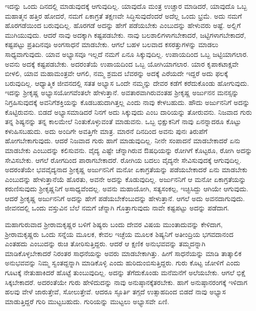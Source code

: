 ಇದನ್ನು ಒಂದು ದಿನದಲ್ಲಿ ಮಾಡುವುದಕ್ಕೆ ಆಗುವುದಿಲ್ಲ. ಯಾವುದೊ ಮಂತ್ರ ಉಚ್ಚಾರ ಮಾಡಿದರೆ, ಯಾವುದೊ ಒಬ್ಬ ಮಹಾತ್ಮನ ಹತ್ತಿರ ಹೋದರೆ, ನಮಗೆ ಏಕಾಗ್ರತೆ ತಕ್ಷಣವೇ ಸಿದ್ಧಿಸುವುದೆಂದರೆ ಅದೆಲ್ಲ ಒಂದು ಭ್ರಮೆ. ಅದು ನಮಗೆ ಹೊರಗಡೆಯಿಂದ ಬರುವುದಿಲ್ಲ. ಹೊರಗಡೆ ಅದನ್ನು ಹೇಗೆ ಪಡೆಯಬೇಕು ಎಂಬುದನ್ನು ಹೇಳುವರು ಅಷ್ಟೆ. ಅಲ್ಲಿಗೆ ಮುಗಿಯುವುದು. ಆದರೆ ನಾವು ಅದಕ್ಕಾಗಿ ಕಷ್ಟಪಡಬೇಕು. ನಾವು ಬಲಶಾಲಿಗಳಾಗಬೇಕಾದರೆ, ಜಟ್ಟಿಗಳಾಗ\-ಬೇಕಾದರೆ, ಕಷ್ಟಪಟ್ಟು ಪ್ರತಿದಿನವೂ ಅಂಗಸಾಧನೆ ಮಾಡಬೇಕು. ಆಗಲೆ ಬಹಳ ಬಲವಾದ ಕಸರತ್ತುಗಳನ್ನು ಮಾಡಲು ಸಾಧ್ಯವಾಗುವುದು. ಯಾವ ಅಭ್ಯಾಸವೂ ಇಲ್ಲದೆ ನಮಗೆ ಏನೂ ಸಿಕ್ಕುವುದಿಲ್ಲ. ಉಪಾಯದಿಂದ ಒಬ್ಬ ಜಟ್ಟಿಯಾಗಲಾರ. ಅವನು ಅದಕ್ಕೆ ಕಷ್ಟಪಡಬೇಕು. ಅದರಂತೆಯೆ ಉಪಾಯದಿಂದ ಒಬ್ಬ ಯೋಗಿಯಾಗಲಾರ. ಯಾರ ಕೃಪಾಕಟಾಕ್ಷವೇ ಬೀಳಲಿ, ಯಾವ ಮಹಾಮಂತ್ರವೇ ಆಗಲಿ, ನಮ್ಮ ಶ್ರಮದ ಬೆವರನ್ನು ಅದಕ್ಕೆ ಎರೆಯದೇ ಇದ್ದರೆ ಅದು ಫಲಕ್ಕೆ ಬರುವುದಿಲ್ಲ. ಆಧ್ಯಾತ್ಮಿಕ ಜೀವನದಲ್ಲಿ ಸತತ ಅಭ್ಯಾಸ ಒಂದೇ ನಮ್ಮನ್ನು ದೇವರ ಕಡೆಗೆ ಕರೆದುಕೊಂಡು ಹೋಗುವುದು. ಇದನ್ನು ಶ‍್ರೀಕೃಷ್ಣ ಅಭ್ಯಾಸಯೋಗವೆಂತಲೇ ಹೇಳುತ್ತಾನೆ. ಅವತಾರವಾಗಿರುವಂತಹ ಶ‍್ರೀಕೃಷ್ಣ ಅರ್ಜುನನ ಮನಸ್ಸನ್ನು ನಿಗ್ರಹಿಸುವುದಕ್ಕೆ ಅವನಿಗೆ\break ಶಕ್ತಿಯನ್ನು ಕೊಡಬಹುದಾಗಿತ್ತಲ್ಲ ಎಂದು ನಾವು ಕೇಳಬಹುದು. ಹೌದು ಅರ್ಜುನನಿಗೆ ಅದನ್ನು ಕೊಟ್ಟಿರುವನು. ಬಿಡದೆ ಅಭ್ಯಾಸಮಾಡಿದರೆ ನಿನಗೆ ಅದು ಸಿಕ್ಕುವುದು ಎಂಬ ದಾರಿಯನ್ನು ತೋರುವನು. ನಿಜವಾದ ಗುರು ತನ್ನ ಶಿಷ್ಯನನ್ನು ತನ್ನ ಕಾಲಮೇಲೆ ನಿಂತುಕೊಳ್ಳುವಂತೆ ಮಾಡು\-ವನು. ಒಬ್ಬ ಭಿಕ್ಷುಕನಿಗೆ ನಾವು ಏನನ್ನಾದರೂ ಕೊಟ್ಟು ಕಳುಹಿಸಬಹುದು. ಅದು ಅಂದಿಗೇ ಅವತ್ತಿಗೇ ಮಾತ್ರ. ಮಾರನೆ ದಿನದಿಂದ ಅವನು ಪುನಃ ತಿರುಪೆಗೆ ಹೋಗಬೇಕಾಗುವುದು. ಆದರೆ ನಿಜವಾದ ಗುರು ಹಾಗೆ ಮಾಡುವುದಿಲ್ಲ. ನೀನೇ ಸಂಪಾದನೆ ಮಾಡಬೇಕಾದರೆ ಏನು ಮಾಡಬೇಕು ಎಂಬುದನ್ನು ಕಲಿಸುವನು. ವೈದ್ಯ ಎಷ್ಟೇ ಚೆನ್ನಾಗಿರುವ ಔಷಧಿಯನ್ನು ರೋಗಿಗೆ ಕೊಟ್ಟರೂ, ರೋಗಿ ಅದನ್ನು ಸೇವಿಸಬೇಕು. ಆಗಲೆ ರೋಗದಿಂದ ಪಾರಾಗಬೇಕಾದರೆ. ರೋಗಿಯ ಬದಲು ವೈದ್ಯನೇ ಸೇವಿಸುವುದಕ್ಕೆ ಆಗುವುದಿಲ್ಲ. ಅದರಂತೆಯೇ ಭವವೈದ್ಯನಾದ ಶ‍್ರೀಕೃಷ್ಣ ಅರ್ಜುನನಿಗೆ ಮನೋ ಏಕಾಗ್ರತೆಯನ್ನು ಪಡೆಯಬೇಕಾದರೆ ಏನು ಮಾಡಬೇಕು ಎಂಬುದನ್ನು ಹೇಳುತ್ತಾನೆಯೆ ಹೊರತು, ಅವನೇ ಅದನ್ನು ಕೊಡುವುದಿಲ್ಲ. ಅರ್ಜುನನಿಗೆ ಆ ಮನೋ ಏಕಾಗ್ರತೆಯನ್ನು ಕರುಣಿಸುವುದು ಶ‍್ರೀಕೃಷ್ಣನಿಗೆ ಅಸಾಧ್ಯವೆಂದಲ್ಲ. ಅವನು ಮಹಾಯೋಗಿ, ಸತ್ಯಸಂಕಲ್ಪ, ಇಚ್ಛಿಸಿದ್ದು ಆಗಿಯೇ ಆಗುವುದು. ಆದರೆ ಶ‍್ರೀಕೃಷ್ಣ ಅರ್ಜುನನಿಗೆ ಅದನ್ನು ಹೇಗೆ ಪಡೆಯಬೇಕೆಂಬುದನ್ನು ಹೇಳುತ್ತಾನೆ. ಆಗಲೆ ಅದು ಅವನದಾಗುವುದು. ಜೀವನದಲ್ಲಿ ಒಂದು ವಸ್ತುವಿನ ಬೆಲೆ ನಮಗೆ ಚೆನ್ನಾಗಿ ಗೊತ್ತಾಗುವುದು ನಾವೇ ಕಷ್ಟಪಟ್ಟು ಅದನ್ನು ಪಡೆದಾಗ.

ಮಹಾಗುರುವಾದ ಶ‍್ರೀರಾಮಕೃಷ್ಣರ ಬಳಿಗೆ ಶಿಷ್ಯರು ಬಂದು ದೇವರ ವಿಷಯ ಮುಂತಾದುವನ್ನು ಕೇಳಿದಾಗ, ಶ‍್ರೀರಾಮಕೃಷ್ಣರು ಒಂದು ಸನ್ನೆಯ ಮೂಲಕ, ಕೇವಲ ಇಚ್ಛೆಯ ಮೂಲಕ ಶಿಷ್ಯನಿಗೆ ಅತೀಂದ್ರಿಯ ಭಗವದಾನಂದ ಎಂತಹದು ಎಂಬುದನ್ನು ರುಚಿ ತೋರಿಸುತ್ತಿದ್ದರು. ಆದರೆ ಆ ಕ್ಷಣಿಕ ಅನುಭವವನ್ನು ತಮ್ಮದನ್ನಾಗಿ ಮಾಡಿಕೊಳ್ಳಬೇಕಾದರೆ ನಿರಂತರ ಸಾಧನೆಯನ್ನು ಅವರು ಮಾಡಬೇಕಾಗಿತ್ತು. ಹೀಗೆ ಸಾಧನೆಯನ್ನು ಮಾಡಿ ತಾತ್ಕಾಲಿಕ ಅನುಭವವನ್ನು ನಿಮ್ಮ ಸ್ವಂತದ್ದನ್ನಾಗಿ ಮಾಡಿಕೊಳ್ಳಿ ಎಂದು ಹುರಿದುಂಬಿಸುತ್ತಿದ್ದರು. ಗುರು ಕೊಟ್ಟ ಜೋಳಿಗೆ ಎಂದು ಗೂಟಕ್ಕೆ ನೇತುಹಾಕಿದರೆ ಹೊಟ್ಟೆ ತುಂಬುವುದಿಲ್ಲ. ಅದನ್ನು ತೆಗೆದುಕೊಂಡು ಮನೆಮನೆಗೆ ಅಲೆಯಬೇಕು. ಆಗಲೆ ಭಿಕ್ಷೆ ಸಿಕ್ಕಬೇಕಾದರೆ. ಅದರಂತೆಯೇ ಗುರು ಹೇಳಿದುದನ್ನು ನಾವು ಅನುಷ್ಠಾನಕ್ಕೆ\break ತರಬೇಕು. ಹಾಗೆ ಅನುಷ್ಠಾನರಂಗಕ್ಕೆ ಇಳಿದಾಗ ಹಲವು ವೇಳೆ ಜಾರುತ್ತೇವೆ, ಸೋಲುತ್ತೇವೆ. ಆದರೂ ಸ್ಫೂರ್ತಿ ತಗ್ಗದೆ ಉತ್ಸಾಹದಿಂದ ಬಿಡದೆ ನಾವು ಅಭ್ಯಾಸ ಮಾಡುತ್ತಿದ್ದರೆ ಗುರಿ ಮುಟ್ಟಬಹುದು. ಗುರಿಯನ್ನು ಮುಟ್ಟಲು ಅಭ್ಯಾಸವೇ ಏಣಿ.

